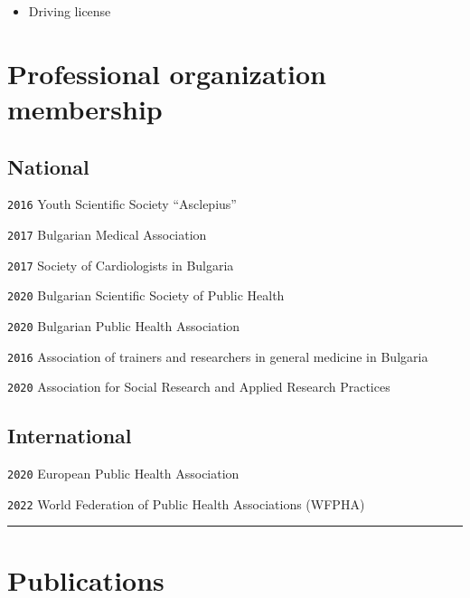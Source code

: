 \documentclass[
  12pt,
  letterpaper,
  DIV=11,
  numbers=noendperiod]{scrartcl}
\providecommand{\tightlist}{%
  \setlength{\itemsep}{0pt}\setlength{\parskip}{0pt}}\usepackage{longtable,booktabs,array}
\begin{document}
\begin{itemize}
\tightlist
\item
  Driving license
\end{itemize}

\section{Professional organization
membership}\label{professional-organization-membership}

\subsection{National}\label{national}

\texttt{2016} Youth Scientific Society ``Asclepius''

\texttt{2017} Bulgarian Medical Association

\texttt{2017} Society of Cardiologists in Bulgaria

\texttt{2020} Bulgarian Scientific Society of Public Health

\texttt{2020} Bulgarian Public Health Association

\texttt{2016} Association of trainers and researchers in general
medicine in Bulgaria

\texttt{2020} Association for Social Research and Applied Research
Practices

\subsection{International}\label{international}

\texttt{2020} European Public Health Association

\texttt{2022} World Federation of Public Health Associations (WFPHA)

\begin{center}\rule{0.5\linewidth}{0.5pt}\end{center}

\section{Publications}\label{publications}
\end{document}
